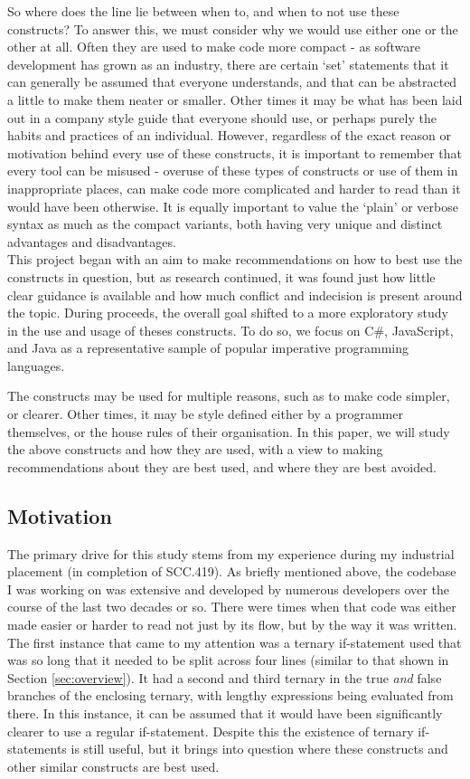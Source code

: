 \documentclass{article}
\begin{document}
        So where does the line lie between when to, and when to not use these constructs? To answer this, we must consider why we would use either one or the other at all. Often they are used to make code more compact - as software development has grown as an industry, there are certain `set' statements that it can generally be assumed that everyone understands, and that can be abstracted a little to make them neater or smaller. Other times it may be what has been laid out in a company style guide that everyone should use, or perhaps purely the habits and practices of an individual. However, regardless of the exact reason or motivation behind every use of these constructs, it is important to remember that every tool can be misused - overuse of these types of constructs or use of them in inappropriate places, can make code more complicated and harder to read than it would have been otherwise. It is equally important to value the `plain' or verbose syntax as much as the compact variants, both having very unique and distinct advantages and disadvantages.
        \\

        This project began with an aim to make recommendations on how to best use the constructs in question, but as research continued, it was found just how little clear guidance is available and how much conflict and indecision is present around the topic. During proceeds, the overall goal shifted to a more exploratory study in the use and usage of theses constructs. To do so, we focus on C\#, JavaScript, and Java as a representative sample of popular imperative programming languages.

        The constructs may be used for multiple reasons, such as to make code simpler, or clearer. Other times, it may be style defined either by a programmer themselves, or the house rules of their organisation.  In this paper, we will study the above constructs and how they are used, with a view to making recommendations about they are best used, and where they are best avoided.
    \subsection{Motivation}
        The primary drive for this study stems from my experience during my industrial placement (in completion of SCC.419). As briefly mentioned above, the codebase I was working on was extensive and developed by numerous developers over the course of the last two decades or so. There were times when that code was either made easier or harder to read not just by its flow, but by the way it was written. The first instance that came to my attention was a ternary if-statement used that was so long that it needed to be split across four lines (similar to that shown in Section \ref{sec:overview}). It had a second and third ternary in the true \emph{and} false branches of the enclosing ternary, with lengthy expressions being evaluated from there. In this instance, it can be assumed that it would have been significantly clearer to use a regular if-statement. Despite this the existence of ternary if-statements is still useful, but it brings into question where these constructs and other similar constructs are best used.
\end{document}

